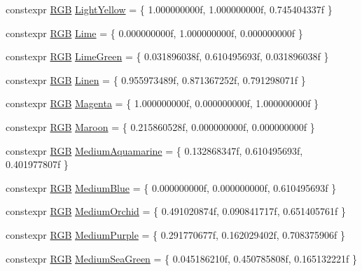 \begin{DoxyCompactItemize}
\item 
constexpr \mbox{\hyperlink{structmage_1_1_r_g_b}{R\+GB}} \mbox{\hyperlink{namespacemage_1_1color_a46b3fdd57b6933a6bafb704682e82518}{Light\+Yellow}} = \{ 1.\+000000000f, 1.\+000000000f, 0.\+745404337f \}
\item 
constexpr \mbox{\hyperlink{structmage_1_1_r_g_b}{R\+GB}} \mbox{\hyperlink{namespacemage_1_1color_ad30a72922fc74a93b1d86e6da0fe3edb}{Lime}} = \{ 0.\+000000000f, 1.\+000000000f, 0.\+000000000f \}
\item 
constexpr \mbox{\hyperlink{structmage_1_1_r_g_b}{R\+GB}} \mbox{\hyperlink{namespacemage_1_1color_a164223d6970354e460665eaf3d163d47}{Lime\+Green}} = \{ 0.\+031896038f, 0.\+610495693f, 0.\+031896038f \}
\item 
constexpr \mbox{\hyperlink{structmage_1_1_r_g_b}{R\+GB}} \mbox{\hyperlink{namespacemage_1_1color_add4a34c183b39c88f3e4ff8d627f5637}{Linen}} = \{ 0.\+955973489f, 0.\+871367252f, 0.\+791298071f \}
\item 
constexpr \mbox{\hyperlink{structmage_1_1_r_g_b}{R\+GB}} \mbox{\hyperlink{namespacemage_1_1color_ace3bc5380195732597310bea2764a6bd}{Magenta}} = \{ 1.\+000000000f, 0.\+000000000f, 1.\+000000000f \}
\item 
constexpr \mbox{\hyperlink{structmage_1_1_r_g_b}{R\+GB}} \mbox{\hyperlink{namespacemage_1_1color_a6573b86c7e6c8c7cbf76c108a5820259}{Maroon}} = \{ 0.\+215860528f, 0.\+000000000f, 0.\+000000000f \}
\item 
constexpr \mbox{\hyperlink{structmage_1_1_r_g_b}{R\+GB}} \mbox{\hyperlink{namespacemage_1_1color_a4560188b77c7b4a82162c749b9e4e5f6}{Medium\+Aquamarine}} = \{ 0.\+132868347f, 0.\+610495693f, 0.\+401977807f \}
\item 
constexpr \mbox{\hyperlink{structmage_1_1_r_g_b}{R\+GB}} \mbox{\hyperlink{namespacemage_1_1color_a0be5a1c37d2e0598414235399e0cb6e2}{Medium\+Blue}} = \{ 0.\+000000000f, 0.\+000000000f, 0.\+610495693f \}
\item 
constexpr \mbox{\hyperlink{structmage_1_1_r_g_b}{R\+GB}} \mbox{\hyperlink{namespacemage_1_1color_a55306d3a39ad61219538ba4527521342}{Medium\+Orchid}} = \{ 0.\+491020874f, 0.\+090841717f, 0.\+651405761f \}
\item 
constexpr \mbox{\hyperlink{structmage_1_1_r_g_b}{R\+GB}} \mbox{\hyperlink{namespacemage_1_1color_a05a317af5ced870161013504175e18b8}{Medium\+Purple}} = \{ 0.\+291770677f, 0.\+162029402f, 0.\+708375906f \}
\item 
constexpr \mbox{\hyperlink{structmage_1_1_r_g_b}{R\+GB}} \mbox{\hyperlink{namespacemage_1_1color_a28991b5b9e22fa71e7554d315741da6c}{Medium\+Sea\+Green}} = \{ 0.\+045186210f, 0.\+450785808f, 0.\+165132221f \}

\end{DoxyCompactItemize}
